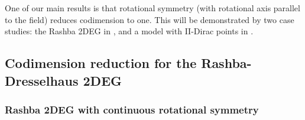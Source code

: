 \documentclass[aps, showpacs, twocolumn, notitlepage, superscriptaddress]{revtex4-1}
\begin{document}


 
One of our main results is that   rotational symmetry (with rotational axis parallel to the field) reduces  codimension to one. This will be demonstrated by two  case studies: the Rashba 2DEG in , and a model with II-Dirac points in . 

\subsection{Codimension reduction for the Rashba-Dresselhaus 2DEG}\label{sec:singleparameterrashba}

\subsubsection{Rashba 2DEG with continuous rotational symmetry}\label{sec:ctsrot}
\end{document}
